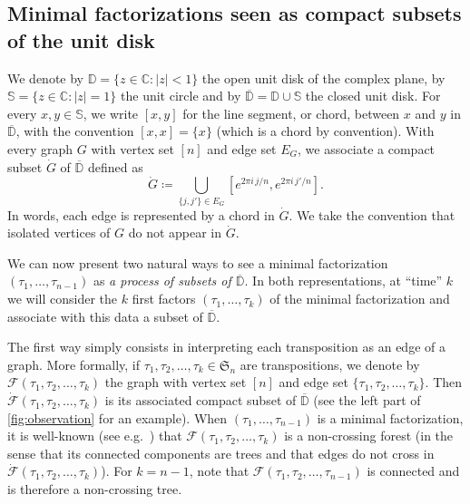 \documentclass[AHL,XML,longabstracts,Unicode]{cedram}
\newcommand{\D}{\mathbb{D}}
\newcommand{\CC}{\mathbb{C}}
\def\S{\mathbb{S}}
\def\FFF{\mathcal F}
\begin{document}
\subsection{Minimal factorizations seen as compact subsets of the unit disk}
\label{sec:introcompacts}

We denote by $\D = \{z \in \CC : |z| < 1\}$ the open unit disk of the complex plane, by $\S = \{z \in \CC : |z| = 1\}$ the unit circle and by $\overline{\D} = \D \cup \S$ the closed unit disk. For every $x, y \in \S$, we write $[x,y]$ for the line segment, or chord, between $x$ and $y$ in $\overline{\D}$, with the convention $[x,x] = \{x\}$ (which is a chord by convention).
With every graph $G$ with vertex set $[n]$ and edge set $E_G$, we associate a compact subset $\dot{G}$ of  $\overline{\D}$
defined as
\[\dot{G} \coloneqq \bigcup_{ \{j,j'\} \in E_G}[e^{2 \pi i\, j/n}, e^{2 \pi i\, j'/n} ].\]
In words, each edge is represented by a chord in $\dot{G}$.
We take the convention that isolated vertices of $G$ do not appear in $\dot{G}$.

We can now present two natural ways to see a minimal factorization $(\tau_1,\dots,\tau_{n-1})$ as
{\em a process of subsets of $\overline{\D}$}.
In both representations, at ``time'' $k$ we will consider the $k$ first factors
$(\tau_1,\dots,\tau_k)$ of the minimal factorization
and associate with this data a subset of $\overline{\D}$.

The first way simply consists  in interpreting each transposition as an edge of a graph.
More formally,
if $\tau_{1}, \tau_{2}, \ldots, \tau_{k} \in \mathfrak{S}_{n}$ are transpositions, we denote by $\FFF(\tau_{1} ,\tau_{2} ,\ldots ,\tau_{k})$ the graph with vertex set $[n]$ and edge set $\{\tau_{1}, \tau_{2}, \ldots, \tau_{k}\}$.
Then $\dot{\FFF}(\tau_{1} ,\tau_{2} ,\ldots ,\tau_{k})$ is its associated compact subset of $\overline{\D}$
(see the left part of \cref{fig:observation} for an example).
When $(\tau_{1}, \ldots, \tau_{n-1})$ is a minimal factorization,
it is well-known (see e.g.\ \cite[Theorem 2.2]{GY02}) that $\FFF(\tau_{1} ,\tau_{2} ,\ldots ,\tau_{k})$ is a non-crossing forest
(in the sense that its connected components are trees and that edges do not cross in  $\dot{\FFF}(\tau_{1} ,\tau_{2} ,\ldots ,\tau_{k})$).
For $k=n-1$, note that $\FFF(\tau_{1}, \tau_{2}, \ldots, \tau_{n-1})$ is connected and is therefore a non-crossing tree.
\end{document}
